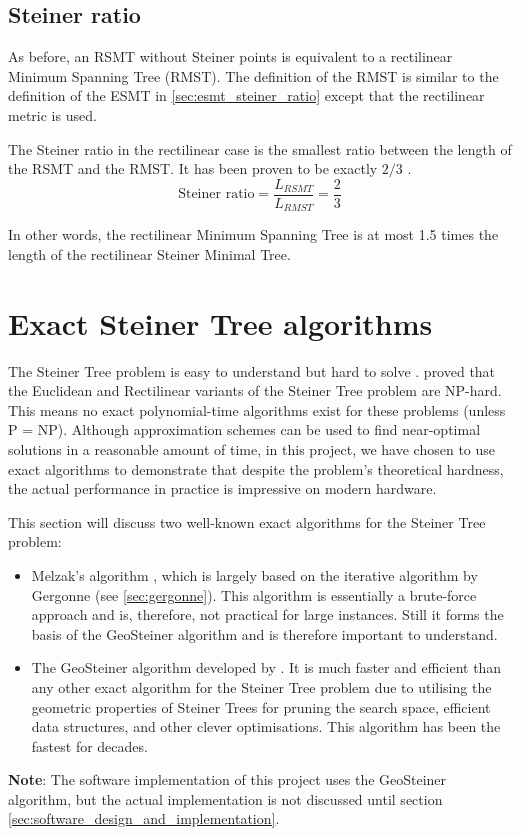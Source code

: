\documentclass{l4proj}
\begin{document}
\subsection{Steiner ratio}
As before, an RSMT without Steiner points is equivalent to a rectilinear Minimum Spanning Tree (RMST). The definition of the RMST is similar to the definition of the ESMT in \ref{sec:esmt_steiner_ratio} except that the rectilinear metric is used.

The Steiner ratio in the rectilinear case is the smallest ratio between the length of the RSMT and the RMST. It has been proven to be exactly $2/3$ \citep{Brazil2015}.
$$
    \text{Steiner ratio} = \frac{L_{RSMT}}{L_{RMST}} = \frac{2}{3}
$$

In other words, the rectilinear Minimum Spanning Tree is at most 1.5 times the length of the rectilinear Steiner Minimal Tree.

\section{Exact Steiner Tree algorithms}
\label{sec:algorithms}
The Steiner Tree problem is easy to understand but hard to solve \citep{Brazil2015}. \cite{Garey1977} proved that the Euclidean and Rectilinear variants of the Steiner Tree problem are NP-hard. This means no exact polynomial-time algorithms exist for these problems (unless P = NP).
Although approximation schemes can be used to find near-optimal solutions in a reasonable amount of time, in this project, we have chosen to use exact algorithms to demonstrate that despite the problem's theoretical hardness, the actual performance in practice is impressive on modern hardware.

This section will discuss two well-known exact algorithms for the Steiner Tree problem:
\begin{itemize}
    \item Melzak's algorithm \citep{MelzakAlgo}, which is largely based on the iterative algorithm by Gergonne (see \ref{sec:gergonne}). This algorithm is essentially a brute-force approach and is, therefore, not practical for large instances. Still it forms the basis of the GeoSteiner algorithm and is therefore important to understand.
    \item The GeoSteiner algorithm developed by \cite{geosteiner96}. It is much faster and efficient than any other exact algorithm for the Steiner Tree problem due to utilising the geometric properties of Steiner Trees for pruning the search space, efficient data structures, and other clever optimisations. This algorithm has been the fastest for decades.
\end{itemize}
\textbf{Note}: The software implementation of this project uses the GeoSteiner algorithm, but the actual implementation is not discussed until section \ref{sec:software_design_and_implementation}.
\end{document}
